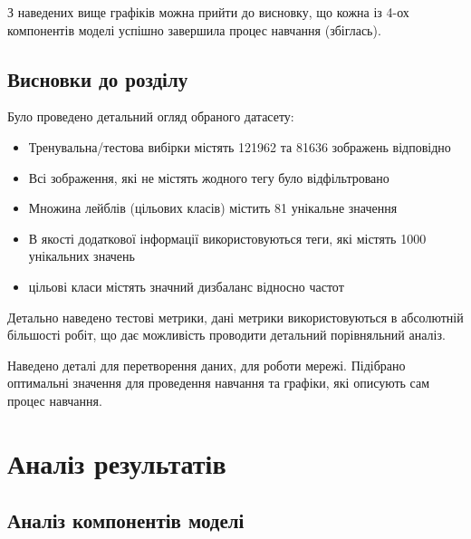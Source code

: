 \documentclass{udstu}
\begin{document}
З наведених вище графіків можна прийти до висновку, що кожна із 4-ох компонентів моделі
успішно завершила процес навчання (збіглась).


\section{Висновки до розділу}

Було проведено детальний огляд обраного датасету:

\begin{itemize}[*]
	\item Тренувальна/тестова вибірки містять 121962 та 81636 зображень відповідно
	\item Всі зображення, які не містять жодного тегу було відфільтровано
	\item Множина лейблів (цільових класів) містить 81 унікальне значення
	\item В якості додаткової інформації використовуються теги, які містять 1000 унікальних значень
	\item цільові класи містять значний дизбаланс відносно частот
\end{itemize}


Детально наведено тестові метрики, дані метрики використовуються в абсолютній більшості робіт,
що дає можливість проводити детальний порівняльний аналіз.

Наведено деталі для перетворення даних, для роботи мережі. Підібрано оптимальні значення для
проведення навчання та графіки, які описують сам процес навчання.


\chapter{Аналіз результатів}

\section{Аналіз компонентів моделі}

\begin{center}
\end{center}
\end{document}

